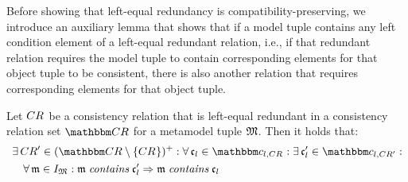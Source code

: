 Before showing that left-equal redundancy is compatibility-preserving, we introduce an auxiliary lemma that shows that if a model tuple contains any left condition element of a left-equal redundant relation, i.e., if that redundant relation requires the model tuple to contain corresponding elements for that object tuple to be consistent, there is also another relation that requires corresponding elements for that object tuple.

\begin{lemma} \label{lemma:leftequalredundancysubset}
    Let $\consistencyrelation{CR}{}$ be a consistency relation that is left-equal redundant in a consistency relation set $\consistencyrelationset{CR}$ for a metamodel tuple $\metamodeltuple{M}$. Then it holds that: 
    \begin{align*}
        &
        \exists \consistencyrelation{CR}{}' \in \transitiveclosure{(\consistencyrelationset{CR} \setminus \setted{\consistencyrelation{CR}{}})} : 
        \forall \conditionelement{c}{l} \in \condition{c}{l, \consistencyrelation{CR}{}} : 
        \exists \conditionelement{c}{l}' \in \condition{c}{l,\consistencyrelation{CR}{}'} : \\
        & \formulaskip
        \forall \modeltuple{m} \in \metamodeltupleinstanceset{M} : 
        \modeltuple{m} \containsmath \conditionelement{c}{l}' \Rightarrow 
        \modeltuple{m} \containsmath \conditionelement{c}{l}
    \end{align*}
\end{lemma}
%
